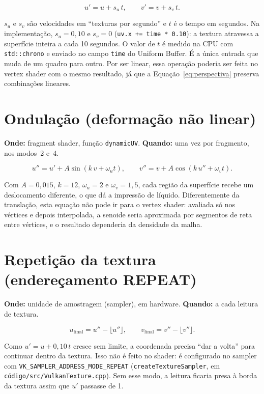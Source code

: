 \begin{equation}
u'=u+s_u\,t,\qquad v'=v+s_v\,t.
\label{eq:translacao}
\end{equation}

\(s_u\) e \(s_v\) são velocidades em ``texturas por segundo'' e \(t\) é o tempo em segundos. Na implementação, \(s_u=0{,}10\) e \(s_v=0\) (\texttt{uv.x += time * 0.10}): a textura atravessa a superfície inteira a cada 10 segundos. O valor de \(t\) é medido na CPU com \texttt{std::chrono} e enviado no campo \texttt{time} do Uniform Buffer. É a única entrada que muda de um quadro para outro. Por ser linear, essa operação poderia ser feita no vertex shader com o mesmo resultado, já que a Equação~\eqref{eq:perspectiva} preserva combinações lineares.

\section{Ondulação (deformação não linear)}
\label{sec:onda}

\textbf{Onde:} fragment shader, função \texttt{dynamicUV}. \textbf{Quando:} uma vez por fragmento, nos modos~2 e~4.

\begin{equation}
u'' = u' + A\sin(k\,v + \omega_u t),\qquad
v'' = v + A\cos(k\,u'' + \omega_v t).
\label{eq:onda}
\end{equation}

Com \(A=0{,}015\), \(k=12\), \(\omega_u=2\) e \(\omega_v=1{,}5\), cada região da superfície recebe um deslocamento diferente, o que dá a impressão de líquido. Diferentemente da translação, esta equação não pode ir para o vertex shader: avaliada só nos vértices e depois interpolada, a senoide seria aproximada por segmentos de reta entre vértices, e o resultado dependeria da densidade da malha.

\section{Repetição da textura (endereçamento REPEAT)}

\textbf{Onde:} unidade de amostragem (sampler), em hardware. \textbf{Quando:} a cada leitura de textura.

\begin{equation}
u_{\text{final}} = u'' - \lfloor u'' \rfloor,\qquad
v_{\text{final}} = v'' - \lfloor v'' \rfloor.
\label{eq:repeat}
\end{equation}

Como \(u' = u + 0{,}10\,t\) cresce sem limite, a coordenada precisa ``dar a volta'' para continuar dentro da textura. Isso não é feito no shader: é configurado no sampler com \texttt{VK\_SAMPLER\_ADDRESS\_MODE\_REPEAT} (\texttt{createTextureSampler}, em \texttt{código/src/VulkanTexture.cpp}). Sem esse modo, a leitura ficaria presa à borda da textura assim que \(u'\) passasse de 1.

